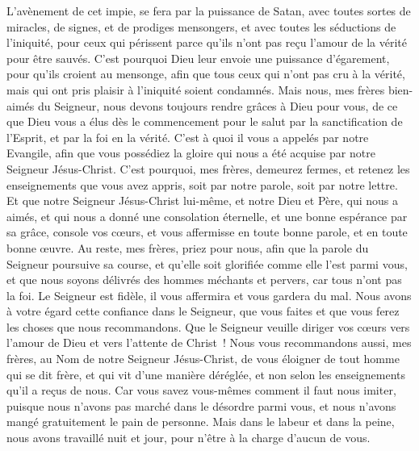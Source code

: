 \begin{multicols}{2}
L'avènement de cet impie, se fera par la puissance de Satan, avec toutes sortes de miracles, de signes, et de prodiges mensongers,
et avec toutes les séductions de l'iniquité, pour ceux qui périssent parce qu'ils n'ont pas reçu l'amour de la vérité pour être sauvés.
C'est pourquoi Dieu leur envoie une puissance d'égarement, pour qu'ils croient au mensonge,
afin que tous ceux qui n'ont pas cru à la vérité, mais qui ont pris plaisir à l'iniquité soient condamnés.
Mais nous, mes frères bien-aimés du Seigneur, nous devons toujours rendre grâces à Dieu pour vous, de ce que Dieu vous a élus dès le commencement pour le salut par la sanctification de l'Esprit, et par la foi en la vérité.
C'est à quoi il vous a appelés par notre Evangile, afin que vous possédiez la gloire qui nous a été acquise par notre Seigneur Jésus-Christ.
C'est pourquoi, mes frères, demeurez fermes, et retenez les enseignements que vous avez appris, soit par notre parole, soit par notre lettre.
Et que notre Seigneur Jésus-Christ lui-même, et notre Dieu et Père, qui nous a aimés, et qui nous a donné une consolation éternelle, et une bonne espérance par sa grâce,
console vos cœurs, et vous affermisse en toute bonne parole, et en toute bonne œuvre.
\VerseOne{}Au reste, mes frères, priez pour nous, afin que la parole du Seigneur poursuive sa course, et qu'elle soit glorifiée comme elle l'est parmi vous,
et que nous soyons délivrés des hommes méchants et pervers, car tous n'ont pas la foi.
Le Seigneur est fidèle, il vous affermira et vous gardera du mal.
Nous avons à votre égard cette confiance dans le Seigneur, que vous faites et que vous ferez les choses que nous recommandons.
Que le Seigneur veuille diriger vos cœurs vers l'amour de Dieu et vers l'attente de Christ~!
Nous vous recommandons aussi, mes frères, au Nom de notre Seigneur Jésus-Christ, de vous éloigner de tout homme qui se dit frère, et qui vit d'une manière déréglée, et non selon les enseignements qu'il a reçus de nous.
Car vous savez vous-mêmes comment il faut nous imiter, puisque nous n'avons pas marché dans le désordre parmi vous,
et nous n'avons mangé gratuitement le pain de personne. Mais dans le labeur et dans la peine, nous avons travaillé nuit et jour, pour n'être à la charge d'aucun de vous.

\end{multicols}
